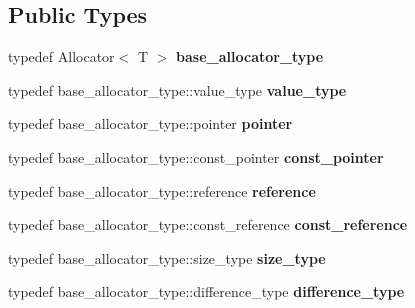 \subsection*{Public Types}
\begin{DoxyCompactItemize}
\item 
\hypertarget{classtbb_1_1zero__allocator_a62f27899a40c4bfaa6ba4313ffc833ef}{}typedef Allocator$<$ T $>$ {\bfseries base\+\_\+allocator\+\_\+type}\label{classtbb_1_1zero__allocator_a62f27899a40c4bfaa6ba4313ffc833ef}

\item 
\hypertarget{classtbb_1_1zero__allocator_a906f5c2d47fff1bf4fd868a2441752d1}{}typedef base\+\_\+allocator\+\_\+type\+::value\+\_\+type {\bfseries value\+\_\+type}\label{classtbb_1_1zero__allocator_a906f5c2d47fff1bf4fd868a2441752d1}

\item 
\hypertarget{classtbb_1_1zero__allocator_afb9458462ffca5d8734968862c9c4e6b}{}typedef base\+\_\+allocator\+\_\+type\+::pointer {\bfseries pointer}\label{classtbb_1_1zero__allocator_afb9458462ffca5d8734968862c9c4e6b}

\item 
\hypertarget{classtbb_1_1zero__allocator_a2a08548bf83e153b40029de72738b60f}{}typedef base\+\_\+allocator\+\_\+type\+::const\+\_\+pointer {\bfseries const\+\_\+pointer}\label{classtbb_1_1zero__allocator_a2a08548bf83e153b40029de72738b60f}

\item 
\hypertarget{classtbb_1_1zero__allocator_a0afb88e128fc595c62f24e34f445d834}{}typedef base\+\_\+allocator\+\_\+type\+::reference {\bfseries reference}\label{classtbb_1_1zero__allocator_a0afb88e128fc595c62f24e34f445d834}

\item 
\hypertarget{classtbb_1_1zero__allocator_a28180fc12dc69c275983f6400526ba01}{}typedef base\+\_\+allocator\+\_\+type\+::const\+\_\+reference {\bfseries const\+\_\+reference}\label{classtbb_1_1zero__allocator_a28180fc12dc69c275983f6400526ba01}

\item 
\hypertarget{classtbb_1_1zero__allocator_a8e741b3db82dfdce3f68cfd6d66901ce}{}typedef base\+\_\+allocator\+\_\+type\+::size\+\_\+type {\bfseries size\+\_\+type}\label{classtbb_1_1zero__allocator_a8e741b3db82dfdce3f68cfd6d66901ce}

\item 
\hypertarget{classtbb_1_1zero__allocator_aba68dc670e813a0c5c7f06e262b66187}{}typedef base\+\_\+allocator\+\_\+type\+::difference\+\_\+type {\bfseries difference\+\_\+type}\label{classtbb_1_1zero__allocator_aba68dc670e813a0c5c7f06e262b66187}

\end{DoxyCompactItemize}
